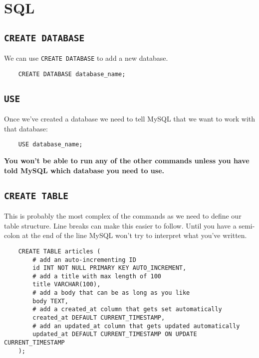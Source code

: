 \section{SQL}

\subsection{\texttt{CREATE DATABASE}}

We can use \texttt{CREATE DATABASE} to add a new database.

\begin{verbatim}
    CREATE DATABASE database_name;
\end{verbatim}


\subsection{\texttt{USE}}

Once we've created a database we need to tell MySQL that we want to work with that database:

\begin{verbatim}
    USE database_name;
\end{verbatim}

\textbf{You won't be able to run any of the other commands unless you have told MySQL which database you need to use.}

\subsection{\texttt{CREATE TABLE}}

This is probably the most complex of the commands as we need to define our table structure. Line breaks can make this easier to follow. Until you have a semi-colon at the end of the line MySQL won't try to interpret what you've written.

\begin{verbatim}
    CREATE TABLE articles (
        # add an auto-incrementing ID
        id INT NOT NULL PRIMARY KEY AUTO_INCREMENT,
        # add a title with max length of 100
        title VARCHAR(100),
        # add a body that can be as long as you like
        body TEXT,
        # add a created_at column that gets set automatically
        created_at DEFAULT CURRENT_TIMESTAMP,
        # add an updated_at column that gets updated automatically
        updated_at DEFAULT CURRENT_TIMESTAMP ON UPDATE CURRENT_TIMESTAMP
    );
\end{verbatim}

